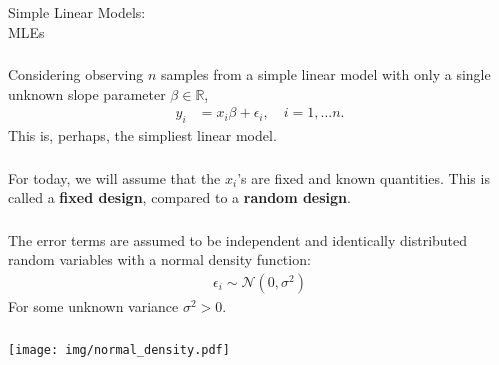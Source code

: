 \begin{frame}[fragile] \frametitle{}

\begin{flushright}
{\color{yaleblue}\sc\fontsize{1cm}{0cm}\selectfont Simple Linear Models:\\\vspace{0.2cm} MLEs}
\end{flushright}

\end{frame}

\begin{frame}[fragile] \frametitle{}

Considering observing $n$ samples
from a simple linear model with only a single unknown
slope parameter $\beta \in \mathbb{R}$, \pause
\begin{align*}
y_i &= x_i\beta  + \epsilon_i, \quad i = 1, \ldots n.
\end{align*}
This is, perhaps, the simpliest linear model.

\end{frame}

\begin{frame}[fragile] \frametitle{}

For today, we will assume that the $x_i$'s are fixed and
known quantities. This is called a {\bf fixed design}, compared
to a {\bf random design}.

\end{frame}

\begin{frame}[fragile] \frametitle{}

The error terms are assumed to be independent and identically
distributed random variables with a normal density function:
\begin{align*}
\epsilon_i \sim \mathcal{N}(0, \sigma^2)
\end{align*}
For some unknown variance $\sigma^2 > 0$.

\end{frame}

\begin{frame}[fragile] \frametitle{}

\begin{center}
\texttt{[image: img/normal\_density.pdf]}
\end{center}

\end{frame}

